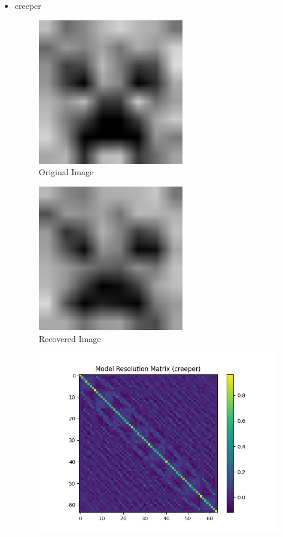 \documentclass{article}
\begin{document}
\begin{itemize}
    \item creeper
\begin{figure}[h]
    \centering
    \includegraphics[width=0.6\textwidth]{images/greyscale/creeper.png}
    \caption{Original Image}
\end{figure}
\begin{figure}[h]
    \centering
    \includegraphics[width=0.6\textwidth]{images/outputs/creeper.png}
    \caption{Recovered Image}
\end{figure}
\begin{figure}[h]
    \centering
    \includegraphics[width=1\textwidth]{images/outputs/modelres/creeper.png}

\end{figure}
\end{itemize}
\end{document}
